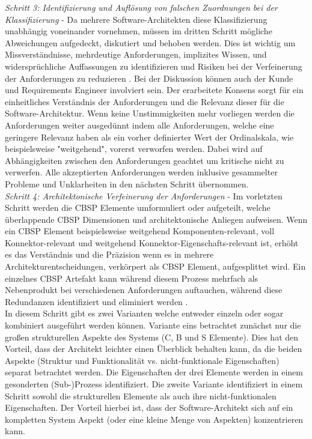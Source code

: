 \emph{Schritt 3: Identifizierung und Aufl\"osung von falschen Zuordnungen bei der Klassifizierung} - 
Da mehrere Software-Architekten diese Klassifizierung unabh\"angig voneinander vornehmen, m\"ussen im dritten Schritt m\"ogliche Abweichungen aufgedeckt, diskutiert und behoben werden. Dies ist wichtig um Missverst\"andnisse, mehrdeutige Anforderungen, implizites Wissen, und widerspr\"uchliche Auffassungen zu identifizieren und Risiken bei der Verfeinerung der Anforderungen zu reduzieren \cite{Gru01}. Bei der Diskussion k\"onnen auch der Kunde und Requirements Engineer involviert sein. Der erarbeitete Konsens sorgt f\"ur ein einheitliches Verst\"andnis der Anforderungen und die Relevanz dieser f\"ur die Software-Architektur. Wenn keine Unstimmigkeiten mehr vorliegen werden die Anforderungen weiter ausged\"unnt indem alle Anforderungen, welche eine geringere Relevanz haben als ein vorher definierter Wert der Ordinalskala, wie beispielsweise "weitgehend", vorerst verworfen werden. Dabei wird auf Abh\"angigkeiten zwischen den Anforderungen geachtet um kritische nicht zu verwerfen. Alle akzeptierten Anforderungen werden inklusive gesammelter Probleme und Unklarheiten in den n\"achsten Schritt \"ubernommen. \\

\emph{Schritt 4: Architektonische Verfeinerung der Anforderungen} - 
Im vorletzten Schritt werden die CBSP Elemente umformuliert oder aufgeteilt, welche \"uberlappende CBSP Dimensionen und architektonische Anliegen aufweisen. Wenn ein CBSP Element beispielsweise weitgehend Komponenten-relevant, voll Konnektor-relevant und weitgehend Konnektor-Eigenschafts-relevant ist, erh\"oht es das Verst\"andnis und die Pr\"azision wenn es in mehrere Architekturentscheidungen, verk\"orpert als CBSP Element, aufgesplittet wird. Ein einzelnes CBSP Artefakt kann w\"ahrend diesem Prozess mehrfach als Nebenprodukt bei verschiedenen Anforderungen auftauchen, w\"ahrend diese Redundanzen identifiziert und eliminiert werden \cite{Gru01}. \\

In diesem Schritt gibt es zwei Varianten welche entweder einzeln oder sogar kombiniert ausgef\"uhrt werden k\"onnen. Variante eins betrachtet zun\"achst nur die gro\ss{}en strukturellen Aspekte des Systems (C, B und S Elemente). Dies hat den Vorteil, dass der Architekt leichter einen Überblick behalten kann, da die beiden Aspekte (Struktur und Funktionalit\"at vs. nicht-funktionale Eigenschaften) separat betrachtet werden. Die Eigenschaften der drei Elemente werden in einem gesonderten (Sub-)Prozess identifiziert. Die zweite Variante identifiziert in einem Schritt sowohl die strukturellen Elemente als auch ihre nicht-funktionalen Eigenschaften. Der Vorteil hierbei ist, dass der Software-Architekt sich auf ein kompletten System Aspekt (oder eine kleine Menge von Aspekten) konzentrieren kann. \\

